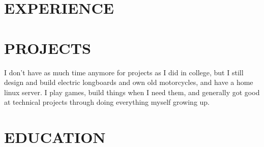 \documentclass[letterpaper,11pt]{article}
\begin{document}





\section{EXPERIENCE}
\resumeSubHeadingListStart




% 

% 
% 
% 

\resumeSubHeadingListEnd


\section{PROJECTS}

I don't have as much time anymore for projects as I did in college, but I still design and build electric longboards and own old motorcycles, and have a home linux server. I play games, build things when I need them, and generally got good at technical projects through doing everything myself growing up.

% 
% 
% 
% 
% 
% 
% 
% 


\section {EDUCATION}
\resumeSubHeadingListStart




\resumeSubHeadingListEnd
\end{document}
